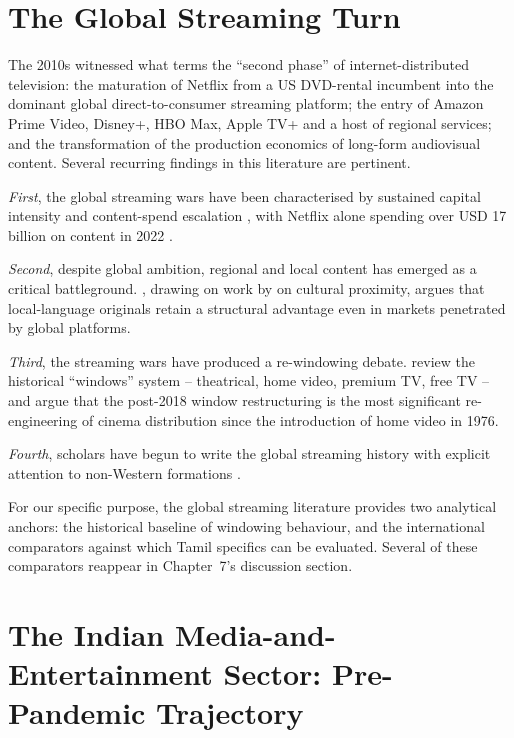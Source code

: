\section{The Global Streaming Turn}
\label{sec:streaming_turn}

The 2010s witnessed what \citet{lotz2017,lotz2022} terms the ``second
phase'' of internet-distributed television: the maturation of Netflix
from a US DVD-rental incumbent into the dominant global
direct-to-consumer streaming platform; the entry of Amazon Prime
Video, Disney+, HBO Max, Apple TV+ and a host of regional services;
and the transformation of the production economics of long-form
audiovisual content.  Several recurring findings in this literature
are pertinent.

\textit{First}, the global streaming wars have been characterised by
sustained capital intensity and content-spend escalation
\citep{lobato2019,fitzgerald2019,jenner2018}, with Netflix alone
spending over USD 17 billion on content in 2022
\citep{economist2022netflix}.

\textit{Second}, despite global ambition, regional and local content
has emerged as a critical battleground.  \citet{lotz2022}, drawing on
work by \citet{straubhaar2007cultural} on cultural proximity, argues
that local-language originals retain a structural advantage even in
markets penetrated by global platforms.

\textit{Third}, the streaming wars have produced a re-windowing
debate.  \citet{cunningham2019} review the historical ``windows''
system -- theatrical, home video, premium TV, free TV -- and argue
that the post-2018 window restructuring is the most significant
re-engineering of cinema distribution since the introduction of
home video in 1976.

\textit{Fourth}, scholars have begun to write the global streaming
history with explicit attention to non-Western formations
\citep{punathambekar2013,jin2019,kanozia2021}.

For our specific purpose, the global streaming literature provides
two analytical anchors: the historical baseline of windowing
behaviour, and the international comparators against which Tamil
specifics can be evaluated.  Several of these comparators reappear
in Chapter~7's discussion section.

\section{The Indian Media-and-Entertainment Sector: Pre-Pandemic
Trajectory}
\label{sec:india_me}

